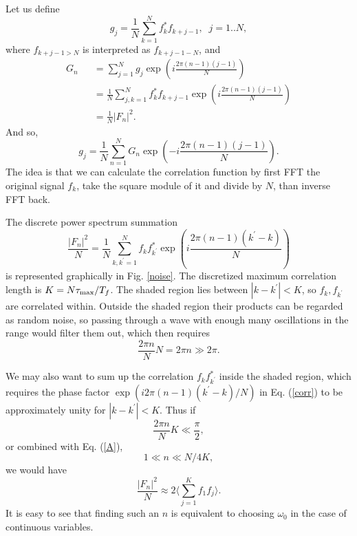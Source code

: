 Let us define
\begin{equation}
g_j = \frac{1}{N} \sum^{N}_{k=1} f^*_k f_{k+j-1}, \;\; j = 1..N, 
\end{equation}
where $f_{k+j-1 > N}$ is interpreted as $f_{k+j-1-N}$, and
\begin{eqnarray}
G_n &&= \sum^{N}_{j=1} g_j \exp\left( i\frac{2\pi (n-1)(j-1) }{N}
    \right ) \nonumber\\
    &&= \frac{1}{N} \sum^{N}_{j,k=1} f^*_k f_{k+j-1} 
\exp\left( i\frac{2\pi (n-1)(j-1) }{N}
    \right )
\nonumber\\
    &&= \frac{1}{N} |F_n|^2.
\end{eqnarray}
And so,
\begin{equation} 
g_j = \frac{1}{N} \sum^{N}_{n=1} G_n 
\exp\left(-i\frac{2\pi (n-1)(j-1)}{N}\right).  
\label{discrete_inverse}
\end{equation}
The idea is that we can calculate the correlation function by first
FFT the original signal $f_k$, take the square module of it and divide
by $N$, than inverse FFT back.

The discrete power spectrum summation
\begin{equation}
\frac{|F_n|^2}{N} = \frac{1}{N} \sum^{N}_{k,k^\prime=1} f_k f_{k^\prime}^*
\exp\left(i\frac{2\pi (n-1)(k^\prime-k)}{N}\right)
\label{corr}
\end{equation}
is represented graphically in Fig. \ref{noise}. The discretized
maximum correlation length is $K = N\tau_{\rm max}/T_f$. The shaded
region lies between $|k-k^\prime| < K$, so $f_k, f_{k^\prime}$ are
correlated within. Outside the shaded region their products can be
regarded as random noise, so passing through a wave with enough many
oscillations in the range would filter them out, which then requires
\begin{equation}
\frac{2\pi n}{N}N  = 2\pi n \gg 2\pi. \label{A}\end{equation}

We may also want to sum up the correlation $f_k f_{k^\prime}^*$ inside
the shaded region, which requires the phase factor $\exp\left(i2\pi
  (n-1)(k^\prime-k)/N\right)$ in Eq.  (\ref{corr}) to be approximately
unity for $|k-k^\prime|<K$. Thus if
\begin{equation}
\frac{2\pi n}{N}K \ll \frac{\pi}{2},
\label{B}
\end{equation}
or combined with Eq. (\ref{A}),
\begin{equation} 1\ll n \ll N/4K, \label{BB}
\end{equation}
we would have
\begin{equation}
\frac{|F_n|^2}{N} \approx 2 \langle \sum^{K}_{j=1} f_1 f_{j} \rangle.
\label{dudu}
\end{equation}
It is easy to see that finding such an $n$ is equivalent to choosing
$\omega_{0}$ in the case of continuous variables.

